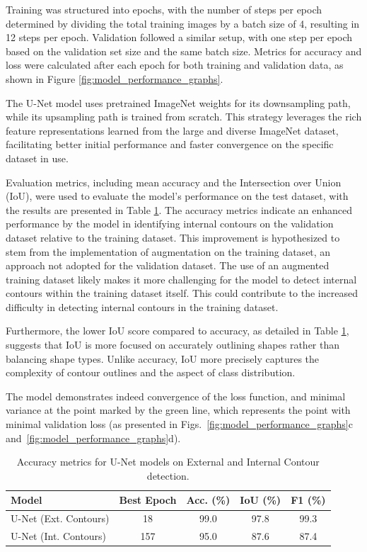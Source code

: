 \documentclass[preprint,12pt]{elsarticle}
\begin{document}
\begin{itemize}
Training was structured into epochs, with the number of steps per epoch determined by dividing the total training images by a batch size of 4, resulting in 12 steps per epoch. Validation followed a similar setup, with one step per epoch based on the validation set size and the same batch size. Metrics for accuracy and loss were calculated after each epoch for both training and validation data, as shown in Figure \ref{fig:model_performance_graphs}.

The U-Net model uses pretrained ImageNet weights for its downsampling path, while its upsampling path is trained from scratch. This strategy leverages the rich feature representations learned from the large and diverse ImageNet dataset, facilitating better initial performance and faster convergence on the specific dataset in use.

Evaluation metrics, including mean accuracy and the Intersection over Union (IoU), were used to evaluate the model's performance on the test dataset, with the results are presented in Table \ref{tab:unet_performance}. The accuracy metrics indicate an enhanced performance by the model in identifying internal contours on the validation dataset relative to the training dataset. This improvement is hypothesized to stem from the implementation of augmentation on the training dataset, an approach not adopted for the validation dataset. The use of an augmented training dataset likely makes it more challenging for the model to detect internal contours within the training dataset itself. This could contribute to the increased difficulty in detecting internal contours in the training dataset.

Furthermore, the lower IoU score compared to accuracy, as detailed in Table \ref{tab:unet_performance}, suggests that IoU is more focused on accurately outlining shapes rather than balancing shape types. Unlike accuracy, IoU more precisely captures the complexity of contour outlines and the aspect of class distribution.

The model demonstrates indeed convergence of the loss function, and minimal variance at the point marked by the green line, which represents the point with minimal validation loss (as presented in Figs.~\ref{fig:model_performance_graphs}c and~\ref{fig:model_performance_graphs}d).

\begin{table}[ht]
\centering
\begin{tabular}{lcccc}
\hline
Model & Best Epoch & Acc. (\%) & IoU (\%) & F1 (\%)\\ \hline
U-Net (Ext. Contours) & 18 & 99.0 & 97.8 & 99.3 \\
U-Net (Int. Contours) & 157 & 95.0 & 87.6 & 87.4 \\ \hline
\end{tabular}
\caption{Accuracy metrics for U-Net models on External and Internal Contour detection.}
\label{tab:unet_performance}
\end{table}


\end{itemize}
\end{document}
